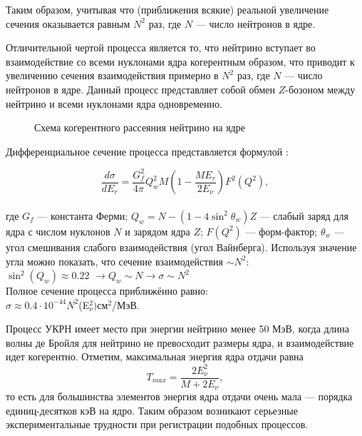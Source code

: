 Таким образом, учитывая что (приближения всякие) реальной увеличение сечения оказывается равным $N^2$ раз, где $N$ --- число нейтронов в ядре.

Отличительной чертой процесса является то, что нейтрино вступает во взаимодействие со всеми нуклонами ядра когерентным образом, что приводит к увеличению сечения взаимодействия примерно в $N^2$ раз, где $N$ --- число нейтронов в ядре. Данный процесс представляет собой обмен $Z$-бозоном между нейтрино и всеми нуклонами ядра одновременно.
\begin{figure}[h]
	\caption{Схема когерентного рассеяния нейтрино на ядре}
	\label{ris:cevns}
\end{figure}
\par Дифференциальное сечение процесса представляется формулой \cite{cevns1, Lindner2017}:
	
\begin{equation}
\frac{d\sigma}{dE_r} = \frac{G_f^2}{4\pi} Q_w^2M\left(1-\frac{ME_r}{2E_\nu}\right)F^2(Q^2),
\end{equation}\\
	
	где $G_f$ --- константа Ферми;
	$Q_w=N-(1-4\sin^{2}\theta_w)Z$ --- слабый заряд для ядра с числом нуклонов $N$ и зарядом ядра $Z$;
	$F(Q^2)$ --- форм-фактор;
	$\theta_w$ --- угол смешивания слабого взаимодействия (угол Вайнберга).
	Используя значение угла можно показать, что сечение взаимодействия
	 $\sim N^2$:\\
	 
	$\sin^2(Q_w)\approx 0.22$ $\to Q_w\sim N \to \sigma \sim N^2$\\
	
	Полное сечение процесса приближённо равно:\\
	
	$\sigma \approx 0.4\cdot10^{-44}  N^2$(E$_\nu^2)$см$^{2}$/МэВ. \\
	\par
	Процесс УКРН имеет место при энергии нейтрино менее 50 МэВ, когда длина волны де Бройля для нейтрино не превосходит размеры ядра, и взаимодействие идет когерентно.
	Отметим, максимальная энергия ядра отдачи равна
\begin{equation}
    T_{max} = \frac{2E_{\nu}^{2}}{M+2E_{\nu}},
    \label{Tmax}
\end{equation}
то есть для большинства элементов энергия ядра отдачи очень мала --- порядка единиц-десятков кэВ на ядро. Таким образом возникают серьезные экспериментальные трудности при регистрации подобных процессов.
